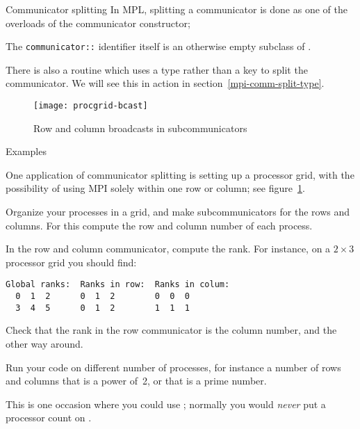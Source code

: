 \begin{mplnote}{Communicator splitting}
  \label{mpl::split}
  In \ac{MPL}, splitting a communicator is done as one of the overloads
  of the communicator constructor;

  \begin{mplimpl}
    The \lstinline+communicator::+ identifier itself is an otherwise empty
    subclass of .
  \end{mplimpl}
\end{mplnote}


There is also a routine 
which uses a type rather than a key to split the communicator.
We will see this in action in section~\ref{mpi-comm-split-type}.

\begin{figure}[ht]
  \texttt{[image: procgrid-bcast]}
  \caption{Row and column broadcasts in subcommunicators}
  \label{fig:procgrid-bcast}
\end{figure}

 {Examples}

One application of communicator splitting is setting up a processor
grid, with the possibility of using MPI solely within one row or
column; see figure~\ref{fig:procgrid-bcast}.

\begin{exercise}
  \label{ex:rowcolcomm}
  Organize your processes in a grid, and make subcommunicators for
  the rows and columns. For this compute the row and column number of
  each process.

  In the row and column communicator, compute the rank. For instance,
  on a $2\times3$ processor grid you should find:
\begin{verbatim}
Global ranks:  Ranks in row:  Ranks in colum:
  0  1  2      0  1  2        0  0  0
  3  4  5      0  1  2        1  1  1
\end{verbatim}

  Check that the rank in the row communicator is the column number,
  and the other way around.

  Run your code on different number of processes, for instance a
  number of rows and columns that is a power of~2, or that is a prime number.
\begin{tacc}
    This is one occasion where you could use ;
    normally you would \emph{never} put a processor count on .
\end{tacc}
\end{exercise}

